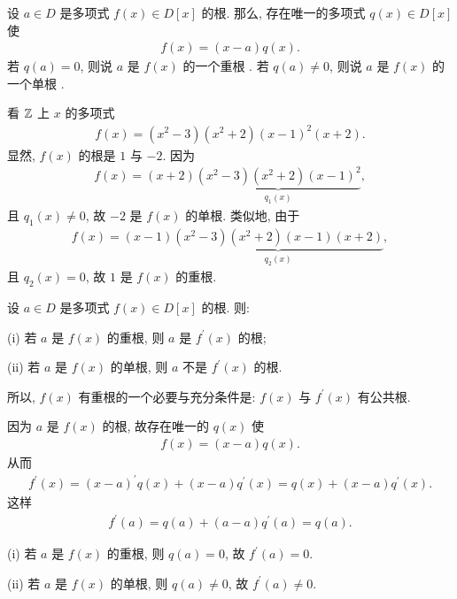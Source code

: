 \begin{definition}
    设 $a \in D$ 是多项式 $f(x) \in D[x]$ 的根. 那么, 存在唯一的多项式 $q(x) \in D[x]$ 使
    \begin{align*}
        f(x) = (x - a) q(x).
    \end{align*}
    若 $q(a) = 0$, 则说 $a$ 是 $f(x)$ 的一个重根 . 若 $q(a) \neq 0$, 则说 $a$ 是 $f(x)$ 的一个单根 .
\end{definition}

\begin{example}
    看 $\mathbb{Z}$ 上 $x$ 的多项式
    \begin{align*}
        f(x) = (x^2 - 3)(x^2 + 2)(x - 1)^2 (x + 2).
    \end{align*}
    显然, $f(x)$ 的根是 $1$ 与 $-2$. 因为
    \begin{align*}
        f(x) = (x + 2) \underbrace{(x^2 - 3)(x^2 + 2)(x - 1)^2}_{q_1 (x)},
    \end{align*}
    且 $q_1 (x) \neq 0$, 故 $-2$ 是 $f(x)$ 的单根. 类似地, 由于
    \begin{align*}
        f(x) = (x - 1) \underbrace{(x^2 - 3)(x^2 + 2)(x - 1)(x + 2)}_{q_2 (x)},
    \end{align*}
    且 $q_2 (x) = 0$, 故 $1$ 是 $f(x)$ 的重根.
\end{example}

\begin{proposition}
    设 $a \in D$ 是多项式 $f(x) \in D[x]$ 的根. 则:

    (i) 若 $a$ 是 $f(x)$ 的重根, 则 $a$ 是 $f^{\prime} (x)$ 的根;

    (ii) 若 $a$ 是 $f(x)$ 的单根, 则 $a$ 不是 $f^{\prime} (x)$ 的根.

    所以, $f(x)$ 有重根的一个必要与充分条件是: $f(x)$ 与 $f^{\prime} (x)$ 有公共根.
\end{proposition}

\begin{pf}
    因为 $a$ 是 $f(x)$ 的根, 故存在唯一的 $q(x)$ 使
    \begin{align*}
        f(x) = (x - a) q(x).
    \end{align*}
    从而
    \begin{align*}
        f^{\prime} (x) = (x - a)^{\prime} q(x) + (x - a) q^{\prime} (x) = q(x) + (x - a) q^{\prime} (x).
    \end{align*}
    这样
    \begin{align*}
        f^{\prime} (a) = q(a) + (a - a) q^{\prime} (a) = q(a).
    \end{align*}

    (i) 若 $a$ 是 $f(x)$ 的重根, 则 $q(a) = 0$, 故 $f^{\prime} (a) = 0$.

    (ii) 若 $a$ 是 $f(x)$ 的单根, 则 $q(a) \neq 0$, 故 $f^{\prime} (a) \neq 0$.
\end{pf}

